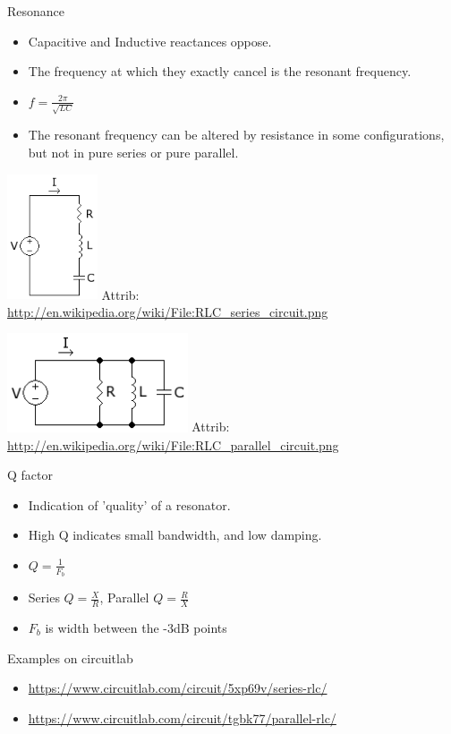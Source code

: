 \documentclass{beamer}
\begin{document}
\begin{frame}{Resonance}{}
\begin{itemize}
\item Capacitive and Inductive reactances oppose.
\item The frequency at which they exactly cancel is the resonant frequency.
\item $f=\frac{2\pi}{\sqrt{LC}}$
\item The resonant frequency can be altered by resistance in some configurations, but not in pure series or pure parallel. 
\end{itemize}

\parbox{0.48\textwidth}{
\includegraphics[width=0.2\textwidth]{images/RLC_series_circuit.png}
Attrib: \url{http://en.wikipedia.org/wiki/File:RLC_series_circuit.png}
}
\parbox{0.48\textwidth}{
\includegraphics[width=0.4\textwidth]{images/RLC_parallel_circuit.png}
Attrib: \url{http://en.wikipedia.org/wiki/File:RLC_parallel_circuit.png}
}
\end{frame}
\begin{frame}{Q factor}{}
\begin{itemize}
\item Indication of 'quality' of a resonator.
\item High Q indicates small bandwidth, and low damping.
\item $Q=\frac{1}{F_b}$
\item Series $Q=\frac{X}{R}$, Parallel $Q=\frac{R}{X}$
\item $F_b$ is width between the -3dB points
\end{itemize}

\end{frame}

\begin{frame}{Examples on circuitlab}{}
\begin{itemize}
\item \url{https://www.circuitlab.com/circuit/5xp69v/series-rlc/}
\item \url{https://www.circuitlab.com/circuit/tgbk77/parallel-rlc/}
\end{itemize}
\end{frame}
\end{document}
